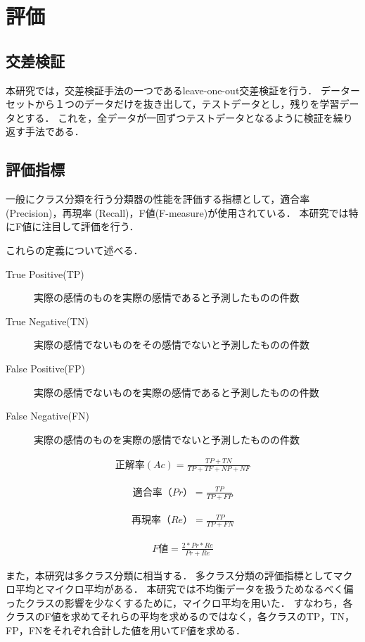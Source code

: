 \section{評価}
\subsection{交差検証}
本研究では，交差検証手法の一つであるleave-one-out交差検証を行う．
データーセットから１つのデータだけを抜き出して，テストデータとし，残りを学習データとする．
これを，全データが一回ずつテストデータとなるように検証を繰り返す手法である．

\subsection{評価指標}
一般にクラス分類を行う分類器の性能を評価する指標として，適合率 (Precision)，再現率 (Recall)，F値(F-measure)が使用されている．
本研究では特にF値に注目して評価を行う．

これらの定義について述べる．

\begin{description}
   \item[True Positive(TP)] 実際の感情のものを実際の感情であると予測したものの件数
   \item[True Negative(TN)] 実際の感情でないものをその感情でないと予測したものの件数
   \item[False Positive(FP)] 実際の感情でないものを実際の感情であると予測したものの件数
   \item[False Negative(FN)] 実際の感情のものを実際の感情でないと予測したものの件数
 \end{description}

\begin{eqnarray}
  正解率(Ac) =  \frac{TP + TN} {TP + TF + NP + NF}
\end{eqnarray}

\begin{eqnarray}
  適合率（Pr） = \frac{TP} {TP + FP}
\end{eqnarray}

\begin{eqnarray}
  再現率（Re） =  \frac{TP} {TP + FN}
\end{eqnarray}

\begin{eqnarray}
  F値 =  \frac{2*Pr*Re}{Pr + Re}
\end{eqnarray}

また，本研究は多クラス分類に相当する．
多クラス分類の評価指標としてマクロ平均とマイクロ平均がある．
本研究では不均衡データを扱うためなるべく偏ったクラスの影響を少なくするために，マイクロ平均を用いた．
すなわち，各クラスのF値を求めてそれらの平均を求めるのではなく，各クラスのTP，TN，FP，FNをそれぞれ合計した値を用いてF値を求める．



